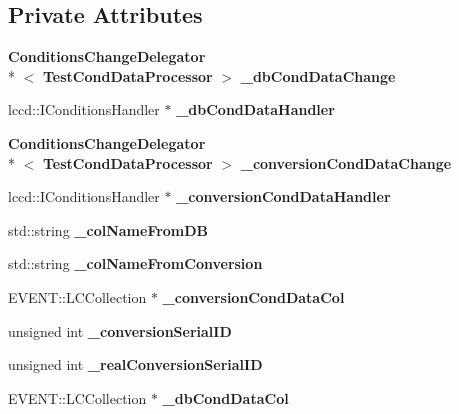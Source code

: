 \subsection*{Private Attributes}
\begin{DoxyCompactItemize}
\item 
{\bf Conditions\-Change\-Delegator}\\*
$<$ {\bf Test\-Cond\-Data\-Processor} $>$ {\bfseries \-\_\-db\-Cond\-Data\-Change}\label{classTestCondDataProcessor_ab49c37286bd6ac0b403d1b8063f6bcde}

\item 
lccd\-::\-I\-Conditions\-Handler $\ast$ {\bfseries \-\_\-db\-Cond\-Data\-Handler}\label{classTestCondDataProcessor_ae03a6373512f70ad3691243833b50fc5}

\item 
{\bf Conditions\-Change\-Delegator}\\*
$<$ {\bf Test\-Cond\-Data\-Processor} $>$ {\bfseries \-\_\-conversion\-Cond\-Data\-Change}\label{classTestCondDataProcessor_ab98e3556c74baf67a8ce442fe9cecf93}

\item 
lccd\-::\-I\-Conditions\-Handler $\ast$ {\bfseries \-\_\-conversion\-Cond\-Data\-Handler}\label{classTestCondDataProcessor_a2bbe530d11b1b857ce8bd5ddd2cc1c4c}

\item 
std\-::string {\bfseries \-\_\-col\-Name\-From\-D\-B}\label{classTestCondDataProcessor_adbf9b678cf507bc9d964e2b40199d2ad}

\item 
std\-::string {\bfseries \-\_\-col\-Name\-From\-Conversion}\label{classTestCondDataProcessor_a0e4d01ed84ec9bb9985fe9ec84049295}

\item 
E\-V\-E\-N\-T\-::\-L\-C\-Collection $\ast$ {\bfseries \-\_\-conversion\-Cond\-Data\-Col}\label{classTestCondDataProcessor_a7a29dd0b074438f7c31d3fe920240c1d}

\item 
unsigned int {\bfseries \-\_\-conversion\-Serial\-I\-D}\label{classTestCondDataProcessor_af0b3f5595528c4f7a4f507dc9b45d89f}

\item 
unsigned int {\bfseries \-\_\-real\-Conversion\-Serial\-I\-D}\label{classTestCondDataProcessor_aacdd9af5954291ecd0e7b02bd545c772}

\item 
E\-V\-E\-N\-T\-::\-L\-C\-Collection $\ast$ {\bfseries \-\_\-db\-Cond\-Data\-Col}\label{classTestCondDataProcessor_afc8c3bce6dae88d7abe3f6655af277fb}


\end{DoxyCompactItemize}
